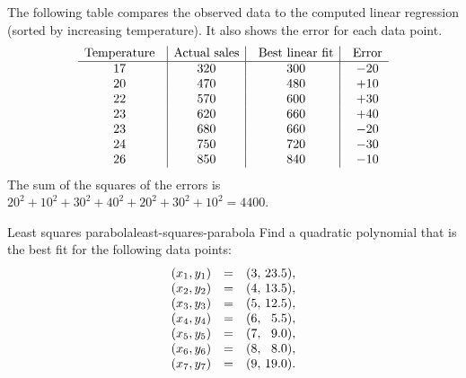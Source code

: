 \begin{solution}
\begin{center}
  \end{center}
  The following table compares the observed data to the computed
  linear regression (sorted by increasing temperature). It also shows
  the error for each data point.
  \begin{equation*}
    \begin{array}{c@{~~~}|c|@{~~~}c|@{~~~}c}
      \mbox{Temperature} & \mbox{Actual sales} & \mbox{Best linear fit} & \mbox{Error}\\\hline
      17 & 320 & 300 & -20 \\
      20 & 470 & 480 & +10 \\
      22 & 570 & 600 & +30 \\
      23 & 620 & 660 & +40 \\
      23 & 680 & 660 & -20 \\
      24 & 750 & 720 & -30 \\
      26 & 850 & 840 & -10 \\
    \end{array}
  \end{equation*}
  The sum of the squares of the errors is $20^2 + 10^2 + 30^2 + 40^2 + 20^2 + 30^2 + 10^2 = 4400$.
\end{solution}

\begin{example}{Least squares parabola}{least-squares-parabola}
  Find a quadratic polynomial that is the best fit for the following
  data points:
  \begin{equation*}
    \begin{array}{rcr@{~}r}
      (x_1,y_1) &=& ( 3,& 23.5), \\
      (x_2,y_2) &=& ( 4,& 13.5), \\
      (x_3,y_3) &=& ( 5,& 12.5), \\
      (x_4,y_4) &=& ( 6,&  5.5), \\
      (x_5,y_5) &=& ( 7,&  9.0), \\
      (x_6,y_6) &=& ( 8,&  8.0), \\
      (x_7,y_7) &=& ( 9,& 19.0). \\
    \end{array}
  \end{equation*}
\end{example}


